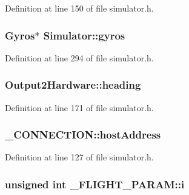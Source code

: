 Definition at line 150 of file simulator.\-h.

\hypertarget{group___h_i_t_l_plugin_ga0f9daef3b0fe0731e035f2bff3d9df19}{
\subsubsection[{gyros}]{\setlength{\rightskip}{0pt plus 5cm}Gyros$\ast$ Simulator\-::gyros\hspace{0.3cm}{\ttfamily [protected]}}}\label{group___h_i_t_l_plugin_ga0f9daef3b0fe0731e035f2bff3d9df19}


Definition at line 294 of file simulator.\-h.

\hypertarget{group___h_i_t_l_plugin_ga061c55e7f046212595dae9123b2589d8}{
\subsubsection[{heading}]{ Output2\-Hardware\-::heading}}\label{group___h_i_t_l_plugin_ga061c55e7f046212595dae9123b2589d8}


Definition at line 171 of file simulator.\-h.

\hypertarget{group___h_i_t_l_plugin_ga21da3bd31909fdf7fd5116c2a91a1176}{
\subsubsection[{host\-Address}]{ \-\_\-\-C\-O\-N\-N\-E\-C\-T\-I\-O\-N\-::host\-Address}}\label{group___h_i_t_l_plugin_ga21da3bd31909fdf7fd5116c2a91a1176}


Definition at line 127 of file simulator.\-h.

\hypertarget{group___h_i_t_l_plugin_gafd95bf6c88f8e93baff6c5e27a5508a4}{
\subsubsection[{i}]{\setlength{\rightskip}{0pt plus 5cm}unsigned {\bf int} \-\_\-\-F\-L\-I\-G\-H\-T\-\_\-\-P\-A\-R\-A\-M\-::i}}\label{group___h_i_t_l_plugin_gafd95bf6c88f8e93baff6c5e27a5508a4}


